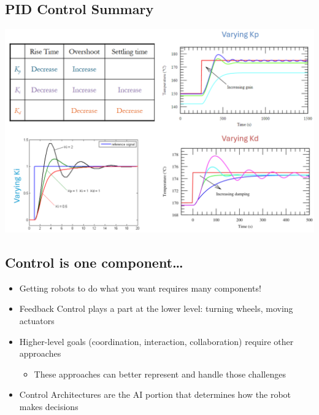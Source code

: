 \documentclass[10pt]{article}
\begin{document}
\subsection*{PID Control Summary}
\begin{center} 
	\includegraphics*[width=\textwidth]{L2_19.png} 
\end{center}

\subsection*{Control is one component\dots}
\begin{itemize}
	\item Getting robots to do what you want requires many components!
	\item Feedback Control plays a part at the lower level: turning wheels, moving actuators
	\item Higher-level goals (coordination, interaction, collaboration) require other approaches
	\begin{itemize}
        \item These approaches can better represent and handle those challenges
    \end{itemize}
    \item Control Architectures are the AI portion that determines how the robot makes decisions
\end{itemize}
\end{document}
